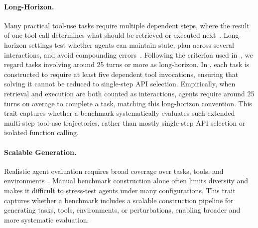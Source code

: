 \paragraph{Long-Horizon.}
Many practical tool-use tasks require multiple dependent steps, where the result of one tool call determines what should be retrieved or executed next~\citep{ReAct}.
Long-horizon settings test whether agents can maintain state, plan across several interactions, and avoid compounding errors~\citep{AgentBench, WebArena, NESTful}.
Following the criterion used in~\citet{Tool-Decathlon}, we regard tasks involving around 25 turns or more as long-horizon.
In \bench{}, each task is constructed to require at least five dependent tool invocations, ensuring that solving it cannot be reduced to single-step API selection.
Empirically, when retrieval and execution are both counted as interactions, agents require around 25 turns on average to complete a task, matching this long-horizon convention.
This trait captures whether a benchmark systematically evaluates such extended multi-step tool-use trajectories, rather than mostly single-step API selection or isolated function calling.


\paragraph{Scalable Generation.}
Realistic agent evaluation requires broad coverage over tasks, tools, and environments~\citep{RandomWorld, ToolLLM, LiveAPIBench,guo2025mathematical}. 
Manual benchmark construction alone often limits diversity and makes it difficult to stress-test agents under many configurations. 
This trait captures whether a benchmark includes a scalable construction pipeline for generating tasks, tools, environments, or perturbations, enabling broader and more systematic evaluation.




